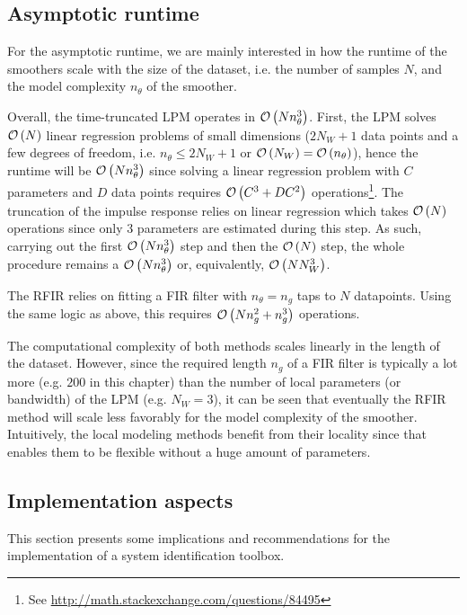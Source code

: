 \subsection{Asymptotic runtime}
For the asymptotic runtime, we are mainly interested in how the runtime of the smoothers scale with the size of the dataset, i.e. the number of samples $N$, and the model complexity $n_{\theta}$ of the smoother.


Overall, the time-truncated \gls{LPM} operates in $\mathcal{O} \left( N n_{\theta}^{3} \right)$.
First, the \gls{LPM} solves $\mathcal{O} \left( N \right)$ linear regression problems of small dimensions ($2N_W + 1$ data points and a few degrees of freedom, i.e. $n_{\theta} \leq 2 N_W + 1$ or $\mathcal{O} \left( N_W \right) = \mathcal{O} \left( n_{\theta} \right)$), hence the runtime will be $\mathcal{O} \left( N n_{\theta}^3 \right)$ since solving a linear regression problem with $C$ parameters and $D$ data points requires $\mathcal{O} \left( C^3  + D C^2 \right)$ operations\footnote{See \url{http://math.stackexchange.com/questions/84495}}.
The truncation of the impulse response relies on linear regression which takes $\mathcal{O} \left( N \right)$ operations since only $3$ parameters are estimated during this step.
As such, carrying out the first $\mathcal{O} \left( N n_{\theta}^3 \right)$ step and then the $\mathcal{O} \left( N \right)$ step, the whole procedure remains a $\mathcal{O} \left( N n_{\theta}^3 \right)$ or, equivalently, $\mathcal{O} \left( N N_W^3 \right)$.

The \gls{RFIR} relies on fitting a \gls{FIR} filter with $n_{\theta} = n_g$ taps to $N$ datapoints.
Using the same logic as above, this requires $\mathcal{O} \left( N n_{g}^2 + n_g^3 \right)$ operations.

The computational complexity  of both methods scales linearly in the length of the dataset.
However, since the required length $n_g$ of a \gls{FIR} filter is typically a lot more (e.g. $200$ in this chapter) than the number of local parameters (or bandwidth) of the \gls{LPM} (e.g. $N_W = 3$), it can be seen that eventually the \gls{RFIR} method will scale less favorably for the model complexity of the smoother.
Intuitively, the local modeling methods benefit from their locality since that enables them to be flexible without a huge amount of parameters.

\subsection{Implementation aspects}
This section presents some implications and recommendations for the implementation of  a system identification toolbox.

